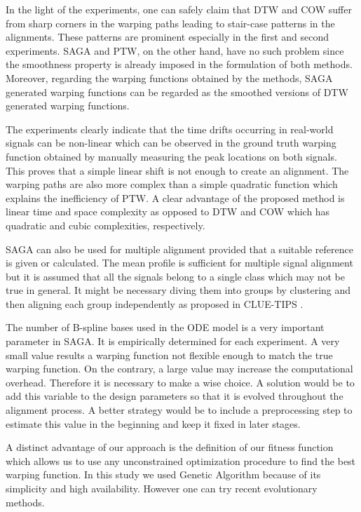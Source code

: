 \documentclass[number,1p,12pt]{elsarticle}
\begin{document}
In the light of the experiments, one can safely claim that DTW and COW suffer from sharp corners in the warping paths leading to stair-case patterns in the alignments. These patterns are prominent especially in the first and second experiments. SAGA and PTW, on the other hand, have no such problem since the smoothness property is already imposed in the formulation of both methods. Moreover, regarding the warping functions obtained by the methods, SAGA generated warping functions can be regarded as the smoothed versions of DTW generated warping functions.

The experiments clearly indicate that the time drifts occurring in real-world signals can be non-linear which can be observed in the ground truth warping function obtained by manually measuring the peak locations on both signals. This proves that a simple linear shift is not enough to create an alignment. The warping paths are also more complex than a simple quadratic function which explains the inefficiency of PTW. A clear advantage of the proposed method is linear time and space complexity as opposed to DTW and COW which has quadratic and cubic complexities, respectively.

SAGA can also be used for multiple alignment provided that a suitable reference is given or calculated. The mean profile is sufficient for multiple signal alignment but it is assumed that all the signals belong to a single class which may not be true in general. It might be necessary diving them into groups by clustering and then aligning each group independently as proposed in CLUE-TIPS \cite{Akella2009}.

The number of B-spline bases used in the ODE model is a very important parameter in SAGA. It is empirically determined for each experiment. A very small value results a warping function not flexible enough to match the true warping function. On the contrary, a large value may increase the computational overhead. Therefore it is necessary to make a wise choice. A solution would be to add this variable to the design parameters so that it is evolved throughout the alignment process. A better strategy would be to include a preprocessing step to estimate this value in the beginning and keep it fixed in later stages.

A distinct advantage of our approach is the definition of our fitness function which allows us to use any unconstrained optimization procedure to find the best warping function. In this study we used Genetic Algorithm because of its simplicity and high availability. However one can try recent evolutionary methods.
\end{document}
